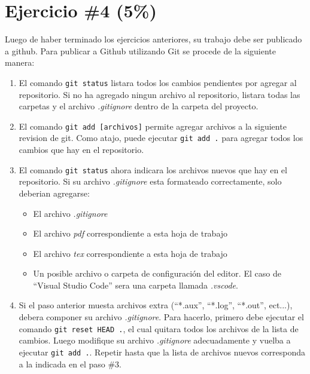 \documentclass{article}
\begin{document}
\section*{Ejercicio \#4 (5\%)}
Luego de haber terminado los ejercicios anteriores, su trabajo debe
ser publicado a github. Para publicar a Github utilizando Git se procede
de la siguiente manera:
\begin{enumerate}
        \item {
                El comando \texttt{git status} listara todos los
                cambios pendientes por agregar al repositorio. Si no
                ha agregado ningun archivo al repositorio, listara todas
                las carpetas y el archivo \emph{.gitignore} dentro de la
                carpeta del proyecto.
        }
        \item{
                El comando \texttt{git add [archivos]} permite agregar
                archivos a la siguiente revision de git. Como atajo,
                puede ejecutar \texttt{git add .} para agregar todos
                los cambios que hay en el repositorio.
        }
        \item {
                El comando \texttt{git status} ahora indicara los archivos
                nuevos que hay en el repositorio. Si su archivo \emph{.gitignore}
                esta formateado correctamente, solo deberian agregarse:
                \begin{itemize}
                        \item{El archivo \emph{.gitignore}}
                        \item{El archivo \emph{pdf} correspondiente a esta hoja de trabajo}
                        \item{El archivo \emph{tex} correspondiente a esta hoja de trabajo}
                        \item{Un posible archivo o carpeta de configuraci\'on del editor.
                        El caso de ``Visual Studio Code'' sera una carpeta llamada \emph{.vscode}.}
                \end{itemize}
        }
        \item{
                Si el paso anterior muesta archivos extra (``*.aux'', ``*.log'', ``*.out'', ect...),
                debera componer su archivo \emph{.gitignore}. Para hacerlo, primero
                debe ejecutar el comando \texttt{git reset HEAD .}, el cual quitara
                todos los archivos de la lista de cambios. Luego modifique su archivo \emph{.gitignore}
                adecuadamente y vuelba a ejecutar \texttt{git add .}. Repetir hasta
                que la lista de archivos nuevos corresponda a la indicada en el paso \#3.
        }
\end{enumerate}
\end{document}
